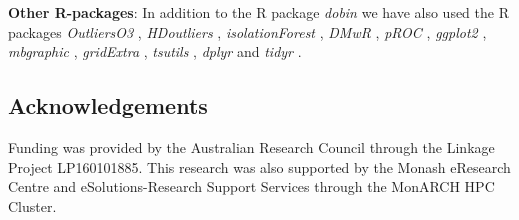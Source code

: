 \documentclass[letter,12pt]{article}
\begin{document}
\textbf{Other R-packages}: In addition to the R package \textit{dobin} we have also used the R packages \textit{OutliersO3} \citep{O3Rpack}, {\color{blue} \textit{HDoutliers} \citep{hdoutliers}}, \textit{isolationForest} \citep{isolationForest}, \textit{DMwR} \citep{DMwR}, \textit{pROC} \citep{pROC}, \textit{ggplot2} \citep{ggplot2}, \textit{mbgraphic} \citep{mbgraphic}, \textit{gridExtra} \citep{gridextra}, \textit{tsutils} \citep{tsutils}, \textit{dplyr} \citep{dplyr} and \textit{tidyr} \citep{tidyr}.%


\subsection*{Acknowledgements}

Funding was provided by the Australian Research Council through the Linkage Project LP160101885. This research was also supported by the Monash eResearch Centre and eSolutions-Research Support Services through the MonARCH HPC Cluster.


\end{document}
